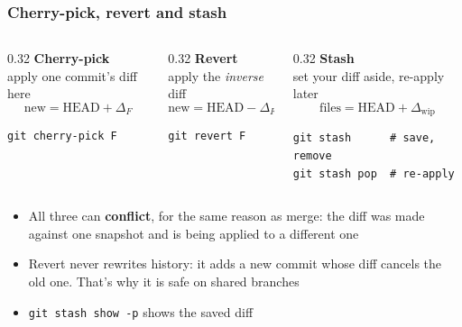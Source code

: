 \documentclass[aspectratio=169,10pt,compress]{beamer}
\newcommand{\cmd}[1]{\texttt{\color{gitred}#1}}
\begin{document}
\begin{frame}[t,fragile] \frametitle{Cherry-pick, revert and stash}
  \begin{columns}[T]
    \begin{column}{0.32\textwidth}
      \textbf{Cherry-pick}\\[2pt]
      apply one commit's diff here
      \[ \text{new} = \text{HEAD} + \Delta_F \]
\begin{lstlisting}
git cherry-pick F
\end{lstlisting}
    \end{column}
    \begin{column}{0.32\textwidth}
      \textbf{Revert}\\[2pt]
      apply the \emph{inverse} diff
      \[ \text{new} = \text{HEAD} - \Delta_F \]
\begin{lstlisting}
git revert F
\end{lstlisting}
    \end{column}
    \begin{column}{0.32\textwidth}
      \textbf{Stash}\\[2pt]
      set your diff aside, re-apply later
      \[ \text{files} = \text{HEAD} + \Delta_{\text{wip}} \]
\begin{lstlisting}
git stash      # save, remove
git stash pop  # re-apply
\end{lstlisting}
    \end{column}
  \end{columns}

  \vspace{0.8em}
  \begin{itemize}
    \item All three can \textbf{conflict}, for the same reason as merge: the diff was made
          against one snapshot and is being applied to a different one
    \item Revert never rewrites history: it adds a new commit whose diff cancels the old one.
          That's why it is safe on shared branches
    \item \cmd{git stash show -p} shows the saved diff
  \end{itemize}
\end{frame}
\end{document}
